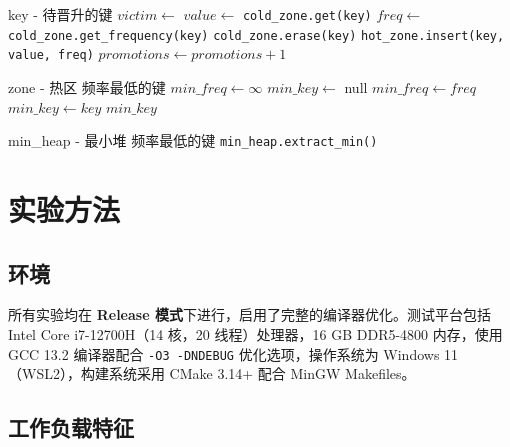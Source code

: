 \documentclass[11pt,a4paper]{article}
\begin{document}
\begin{algorithm}[H]
\caption{晋升操作}
\label{alg:promote}
\begin{algorithmic}[1]
\Require key - 待晋升的键
    \State $victim \gets$ 
    \State {}
\EndIf
\State $value \gets$ \texttt{cold\_zone.get(key)}
\State $freq \gets$ \texttt{cold\_zone.get\_frequency(key)}
\State \texttt{cold\_zone.erase(key)}
\State \texttt{hot\_zone.insert(key, value, freq)}
\State $promotions \gets promotions + 1$
\end{algorithmic}
\end{algorithm}

\begin{algorithm}[H]
\caption{淘汰操作（基础版）}
\label{alg:evict}
\begin{algorithmic}[1]
\Require zone - 热区
\Ensure 频率最低的键
\State $min\_freq \gets \infty$
\State $min\_key \gets$ null
        \State $min\_freq \gets freq$
        \State $min\_key \gets key$
    \EndIf
\EndFor
\State \Return $min\_key$
\end{algorithmic}
\end{algorithm}

\begin{algorithm}[H]
\caption{淘汰操作（堆优化版）}
\label{alg:evict_heap}
\begin{algorithmic}[1]
\Require min\_heap - 最小堆
\Ensure 频率最低的键
\State \Return \texttt{min\_heap.extract\_min()}
\end{algorithmic}
\end{algorithm}

\section{实验方法}

\subsection{环境}

所有实验均在 \textbf{Release 模式}下进行，启用了完整的编译器优化。测试平台包括 Intel Core i7-12700H（14 核，20 线程）处理器，16 GB DDR5-4800 内存，使用 GCC 13.2 编译器配合 \texttt{-O3 -DNDEBUG} 优化选项，操作系统为 Windows 11（WSL2），构建系统采用 CMake 3.14+ 配合 MinGW Makefiles。

\subsection{工作负载特征}
\end{document}
